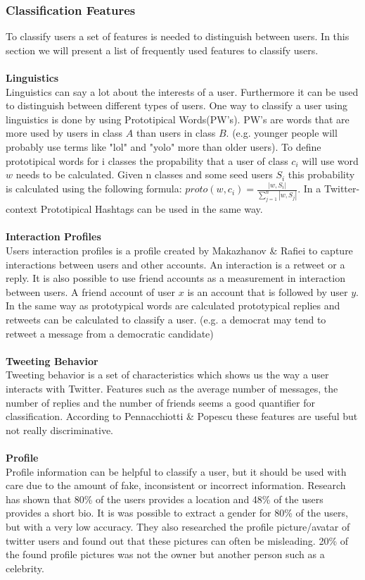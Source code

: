 \documentclass{article}
\begin{document}
\subsubsection{Classification Features}
To classify users a set of features is needed to distinguish between users. In this section we will present a list of frequently used features to classify users.  
\\\\
\textbf{Linguistics}\\
Linguistics can say a lot about the interests of a user. Furthermore it can be used to distinguish between different types of users. One way to classify a user using linguistics is done by using Prototipical Words(PW's). \cite{userclasst} PW's are words that are more used by users in class $A$ than users in class $B$. (e.g. younger people will probably use terms like "lol" and "yolo" more than older users). To define prototipical words for i classes the propability that a user of class $c_i$ will use word $w$ needs to be calculated. Given n classes and some seed users $S_i$ this probability is calculated using the following formula: $proto(w, c_i) = \frac{|w, S_i|}{\sum_{j=1}^n |w, S_j|}$. \cite{userclasst} In a Twitter-context Prototipical Hashtags can be used in the same way.
\\\\
\textbf{Interaction Profiles}\\
Users interaction profiles is a profile created by Makazhanov \& Raﬁei to capture interactions between users and other accounts. \cite{pol} An interaction is a retweet or a reply. It is also possible to use friend accounts as a measurement in interaction between users.  A friend account of user $x$ is an account that is followed by user $y$. In the same way as prototypical words are calculated prototypical replies and retweets can be calculated to classify a user. (e.g. a democrat may tend to retweet a message from a democratic candidate) \cite{userclasst} 
\\\\  
\textbf{Tweeting Behavior}\\
Tweeting behavior is a set of characteristics which shows us the way a user interacts with Twitter. Features such as the average number of messages, the number of replies and the number of friends seems a good quantifier for classification. According to Pennacchiotti \& Popescu these features are useful but not really discriminative. \cite{userclasst} 
\\\\
\textbf{Profile}\\
Profile information can be helpful to classify a user, but it should be used with care due to the amount of fake, inconsistent or incorrect information. Research has shown that 80\% of the users provides a location and 48\% of the users provides a short bio. \cite{usermachine} It is was possible to extract a gender for 80\% of the users, but with a very low accuracy. They also researched the profile picture/avatar of twitter users and found out that these pictures can often be misleading. 20\% of the found profile pictures was not the owner but another person such as a celebrity. \cite{usermachine}
\end{document}
